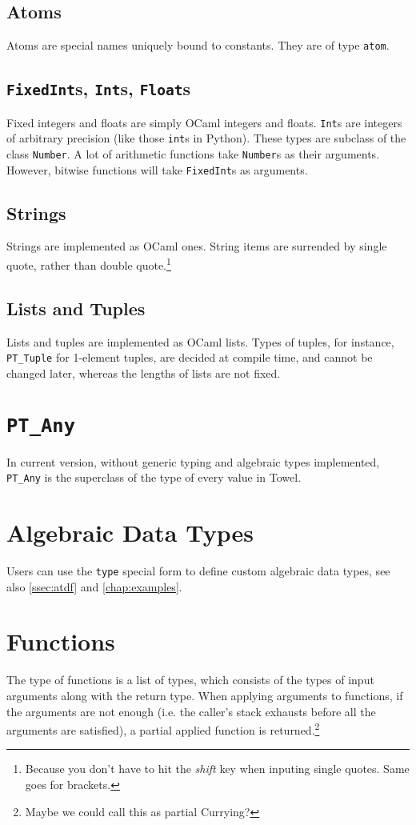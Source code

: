 \documentclass{book}
\begin{document}
\subsection{Atoms}
Atoms are special names uniquely bound to constants. They are of type \texttt{atom}.

\subsection{\texttt{FixedInt}s, \texttt{Int}s, \texttt{Float}s}
Fixed integers and floats are simply OCaml integers and floats. \texttt{Int}s are integers of arbitrary precision (like those \texttt{int}s in Python). These types are subclass of the class \texttt{Number}. A lot of arithmetic functions take \texttt{Number}s as their arguments. However, bitwise functions will take \texttt{FixedInt}s as arguments.

\subsection{Strings}
Strings are implemented as OCaml ones. String items are surrended by single quote, rather than double quote.\footnote{Because you don't have to hit the \textit{shift} key when inputing single quotes. Same goes for brackets.}

\subsection{Lists and Tuples}
Lists and tuples are implemented as OCaml lists. Types of tuples, for instance, \texttt{PT\_Tuple} for 1-element tuples, are decided at compile time, and cannot be changed later, whereas the lengths of lists are not fixed.

\section{\texttt{PT\_Any}}
In current version, without generic typing and algebraic types implemented, \texttt{PT\_Any} is the superclass of the type of every value in Towel.

\section{Algebraic Data Types}
Users can use the \texttt{type} special form to define custom algebraic data types, see also \autoref{ssec:atdf} and \autoref{chap:examples}.

\section{Functions}
The type of functions is a list of types, which consists of the types of input arguments along with the return type. When applying arguments to functions, if the arguments are not enough (i.e. the caller's stack exhausts before all the arguments are satisfied), a partial applied function is returned.\footnote{Maybe we could call this as partial Currying?}
\end{document}
